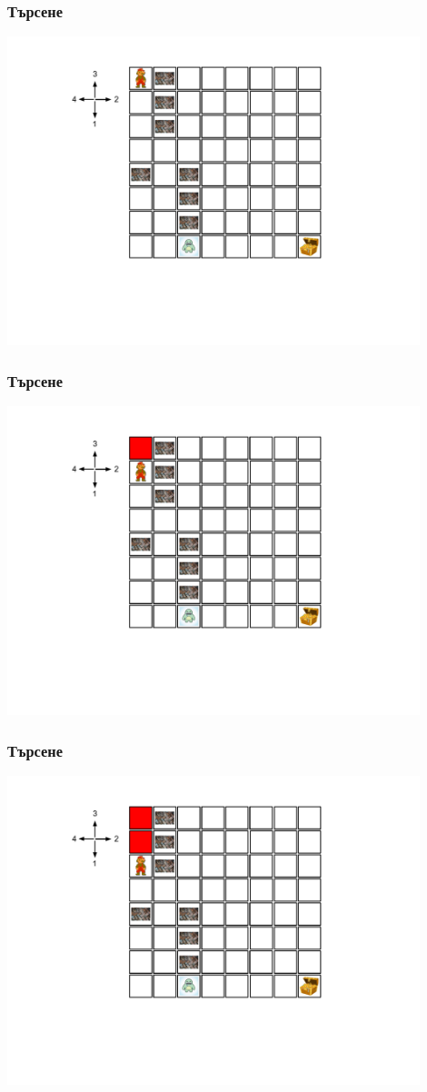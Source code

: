 \documentclass{beamer}
\begin{document}
\begin{frame}[fragile]
  \frametitle{Търсене}
  \includegraphics[width=12cm]{images/lab_00}
\end{frame}

\begin{frame}[fragile]
\frametitle{Търсене}
\includegraphics[width=12cm]{images/lab_01}
\end{frame}

\begin{frame}[fragile]
\frametitle{Търсене}
\includegraphics[width=12cm]{images/lab_02}
\end{frame}
\end{document}

